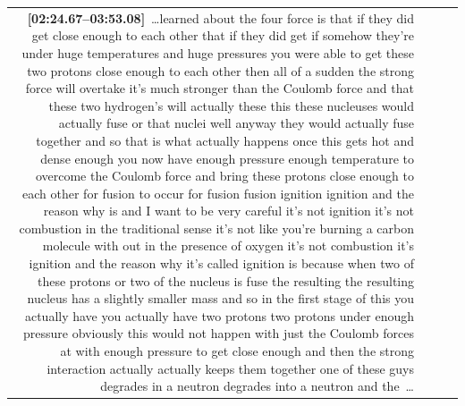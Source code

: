 \documentclass[10pt]{article}
\begin{document}
\begin{tiny}
\begin{longtable}{r p{0.3in} p{1.212in} p{3.8in}}
                                                                                                                                                                                                                                                                                                                                                    \textbf{[02:24.67--03:53.08]}~\ldots learned about the four force is that if they did get close enough to each other that if they did get if somehow they're under huge temperatures and huge pressures you were able to get these two protons close enough to each other then all of a sudden the strong force will overtake it's much stronger than the Coulomb force and that these two hydrogen's will actually these this these nucleuses would actually fuse or that nuclei well anyway they would actually fuse together and so that is what actually happens once this gets hot and dense enough you now have enough pressure enough temperature to overcome the Coulomb force and bring these protons close enough to each other for fusion to occur for fusion fusion ignition ignition and the reason why is and I want to be very careful it's not ignition it's not combustion in the traditional sense it's not like you're burning a carbon molecule with out in the presence of oxygen it's not combustion it's ignition and the reason why it's called ignition is because when two of these protons or two of the nucleus is fuse the resulting the resulting nucleus has a slightly smaller mass and so in the first stage of this you actually have you actually have two protons two protons under enough pressure obviously this would not happen with just the Coulomb forces at with enough pressure to get close enough and then the strong interaction actually actually keeps them together one of these guys degrades in a neutron degrades into a neutron and the~\ldots \\

\end{longtable}
\end{tiny}
\end{document}
